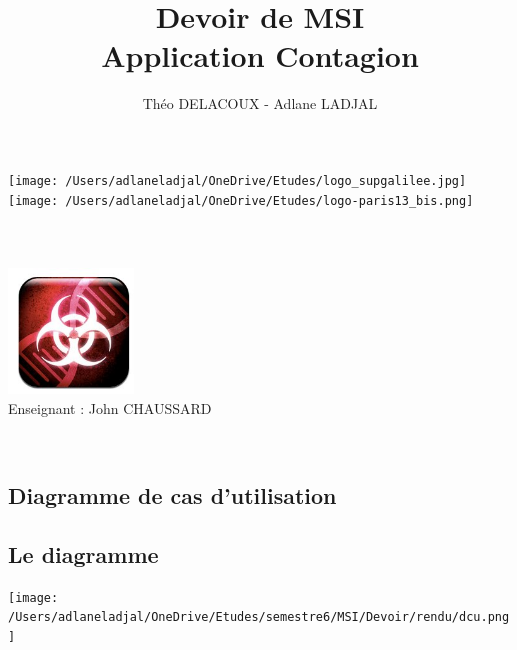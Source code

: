\documentclass[11pt,a4paper]{article}
\author{Théo DELACOUX - Adlane LADJAL}
\title{Devoir de MSI \\ Application Contagion}
\begin{document}
\makeatletter
\begin{titlepage}
	\centering
	\texttt{[image: /Users/adlaneladjal/OneDrive/Etudes/logo\_supgalilee.jpg]}
	\hfill
	\texttt{[image: /Users/adlaneladjal/OneDrive/Etudes/logo-paris13\_bis.png]} \\
    \vspace{5cm}
       {\LARGE \textbf{\@title}} \\
    \vspace{2em}
        {\large \@author }\\
    \vspace{1em}
        {\textit{\@date}} \\
    \vspace{2em}
    		\includegraphics[width=0.25\textwidth]{contagion-logo.jpg}\\
    	\vspace{2em}
    		{Enseignant : John CHAUSSARD} \\
    \vfill
\end{titlepage}


\newpage
~
\newpage

\renewcommand{\contentsname}{Sommaire}
\tableofcontents

\newpage

\pagestyle{empty}

\begin{landscape}
\section{Diagramme de cas d'utilisation}

\subsection{Le diagramme}

\vspace{1cm}

\texttt{[image: /Users/adlaneladjal/OneDrive/Etudes/semestre6/MSI/Devoir/rendu/dcu.png]}

\end{landscape}
\end{document}
